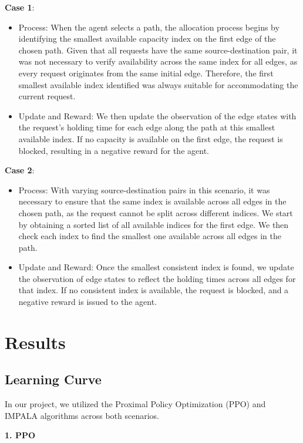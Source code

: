 \documentclass[conference]{IEEEtran}
\begin{document}
\textbf{Case 1}: 
\begin{itemize}
    \item Process: When the agent selects a path, the allocation process begins by identifying the smallest available capacity index on the first edge of the chosen path. Given that all requests have the same source-destination pair, it was not necessary to verify availability across the same index for all edges, as every request originates from the same initial edge. Therefore, the first smallest available index identified was always suitable for accommodating the current request.
    \item Update and Reward: We then update the observation of the edge states with the request’s holding time for each edge along the path at this smallest available index. If no capacity is available on the first edge, the request is blocked, resulting in a negative reward for the agent.
\end{itemize}


\textbf{Case 2}: 
\begin{itemize}
    \item Process: With varying source-destination pairs in this scenario, it was necessary to ensure that the same index is available across all edges in the chosen path, as the request cannot be split across different indices. We start by obtaining a sorted list of all available indices for the first edge. We then check each index to find the smallest one available across all edges in the path.
    \item Update and Reward: Once the smallest consistent index is found, we update the observation of edge states to reflect the holding times across all edges for that index. If no consistent index is available, the request is blocked, and a negative reward is issued to the agent.
\end{itemize}


\section{Results}
\subsection{Learning Curve}

In our project, we utilized the Proximal Policy Optimization (PPO) and IMPALA algorithms across both scenarios. 

\textbf{1. PPO} 
\end{document}
